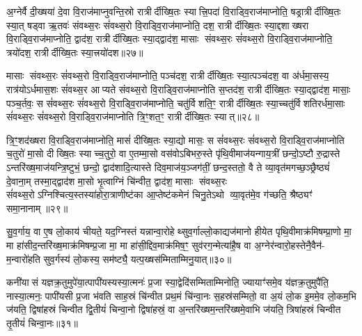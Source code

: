 {\anuvakamend[{अ॒ग्निस्तथ्स॒ꣵ॒स्कृत्या॒ग्नेर्दश॑ च॥६॥}]}

अ॒ग्नेर्वै दी॒ख्षया॑ दे॒वा वि॒राज॑माप्नुवन्ति॒स्रो रात्रीर्दीख्षि॒तः स्यात्त्रि॒पदा॑ वि॒राड्वि॒राज॑माप्नोति॒ षड्रात्रीर्दीख्षि॒तः स्या॒त् षड्वा ऋ॒तवः॑ संवथ्स॒रः सं॑वथ्स॒रो वि॒राड्वि॒राज॑माप्नोति॒ दश॒ रात्रीर्दीख्षि॒तः स्या॒द्दशाख्षरा वि॒राड्वि॒राज॑माप्नोति॒ द्वाद॑श॒ रात्रीर्दीख्षि॒तः स्या॒द्द्वाद॑श॒ मासाः संवथ्स॒रः सं॑वथ्स॒रो वि॒राड्वि॒राज॑माप्नोति॒ त्रयो॑दश॒ रात्रीर्दीख्षि॒तः स्या॒त्त्रयो॑दश॥२७॥

मासाः संवथ्स॒रः सं॑वथ्स॒रो वि॒राड्वि॒राज॑माप्नोति॒ पञ्च॑दश॒ रात्रीर्दीख्षि॒तः स्या॒त्पञ्च॑दश॒ वा अ॑र्धमा॒सस्य॒ रात्र॑योऽर्धमास॒शः सं॑वथ्स॒र आप्यते संवथ्स॒रो वि॒राड्वि॒राज॑माप्नोति स॒प्तद॑श॒ रात्रीर्दीख्षि॒तः स्या॒द्द्वाद॑श॒ मासाः॒ पञ्च॒र्तवः॒ स सं॑वथ्स॒रः सं॑वथ्स॒रो वि॒राड्वि॒राज॑माप्नोति॒ चतु॑र्विशति॒ꣳ॒ रात्रीर्दीख्षि॒तः स्या॒च्चतु॑र्विशतिरर्धमा॒साः सं॑वथ्स॒रः सं॑वथ्स॒रो वि॒राड्वि॒राज॑माप्नोति त्रि॒ꣳ॒शत॒ꣳ॒ रात्रीर्दीख्षि॒तः स्यात्॥२८॥

त्रि॒ꣳ॒शद॑ख्षरा वि॒राड्वि॒राज॑माप्नोति॒ मासं॑ दीख्षि॒तः स्या॒द्यो मासः॒ स सं॑वथ्स॒रः सं॑वथ्स॒रो वि॒राड्वि॒राज॑माप्नोति च॒तुरो॑ मा॒सो दीख्षि॒तः स्याच्च॒तुरो॒ वा ए॒तम्मा॒सो वस॑वोऽबिभरु॒स्ते पृ॑थि॒वीमाज॑यन्गाय॒त्रीं छन्दो॒ऽष्टौ रु॒द्रास्ते ऽन्तरि॑ख्ष॒माज॑यन्त्रि॒ष्टुभं॒ छन्दो॒ द्वाद॑शादि॒त्यास्ते दिव॒माज॑य॒ञ्जग॑तीं॒ छन्द॒स्ततो॒ वै ते व्या॒वृत॑मगच्छ॒ञ्छ्रैष्ठ्यं॑ दे॒वाना॒म् तस्मा॒द्द्वाद॑श मा॒सो भृ॒त्वाग्निं चि॑न्वीत॒ द्वाद॑श॒ मासाः संवथ्स॒रः सं॑वथ्स॒रोऽग्निश्चित्य॒स्तस्या॑होरा॒त्राणीष्ट॑का आ॒प्तेष्ट॑कमेनं चिनु॒तेऽथो व्या॒वृत॑मे॒व ग॑च्छति॒ श्रैष्ठ्यꣳ॑ समा॒नानाम्॥२९॥

{\anuvakamend[{स्या॒त्त्रयो॑दश त्रि॒ꣳ॒शत॒ꣳ॒ रात्रीर्दीख्षि॒तः स्या॒द्वै तेऽष्टाविꣳ॑शतिश्च॥७॥}]}

सु॒व॒र्गाय॒ वा ए॒ष लो॒काय॑ चीयते॒ यद॒ग्निस्तं यन्नान्वा॒रोहेथ्सुव॒र्गाल्लो॒काद्यज॑मानो हीयेत पृथि॒वीमाक्र॑मिषम्प्रा॒णो मा॒ मा हा॑सीद॒न्तरि॑ख्ष॒माक्र॑मिषम्प्र॒जा मा॒ मा हा॑सी॒द्दिव॒माक्र॑मिष॒ꣳ॒ सुव॑रग॒न्मेत्या॑है॒ष वा अ॒ग्नेर॑न्वारो॒हस्तेनै॒वैन॑- म॒न्वारो॑हति सुव॒र्गस्य॑ लो॒कस्य॒ सम॑ष्ट्यै॒ यत्प॒ख्षस॑म्मिताम्मिनु॒यात्॥३०॥

कनी॑यासं यज्ञक्र॒तुमुपे॑या॒त्पापी॑यस्यस्या॒त्मनः॑ प्र॒जा स्या॒द्वेदि॑सम्मिताम्मिनोति॒ ज्यायाꣳ॑समे॒व य॑ज्ञक्र॒तुमुपै॑ति॒ नास्या॒त्मनः॒ पापी॑यसी प्र॒जा भ॑वति साह॒स्रं चि॑न्वीत प्रथ॒मं चि॑न्वा॒नः स॒हस्र॑सम्मितो॒ वा अ॒यं लो॒क इ॒ममे॒व लो॒कम॒भि ज॑यति॒ द्विषा॑हस्रं चिन्वीत द्वि॒तीयं॑ चिन्वा॒नो द्विषा॑हस्रं॒ वा अ॒न्तरि॑ख्षम॒न्तरि॑ख्षमे॒वाभि ज॑यति॒ त्रिषा॑हस्रं चिन्वीत तृ॒तीयं॑ चिन्वा॒नः॥३१॥

